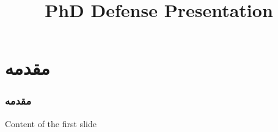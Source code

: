 \documentclass{beamer}
\title{PhD Defense Presentation}
\begin{document}
\begin{frame}
  \titlepage
\end{frame}

\section{مقدمه}

\begin{frame}
  \frametitle{مقدمه}
  Content of the first slide
\end{frame}

\end{document}
